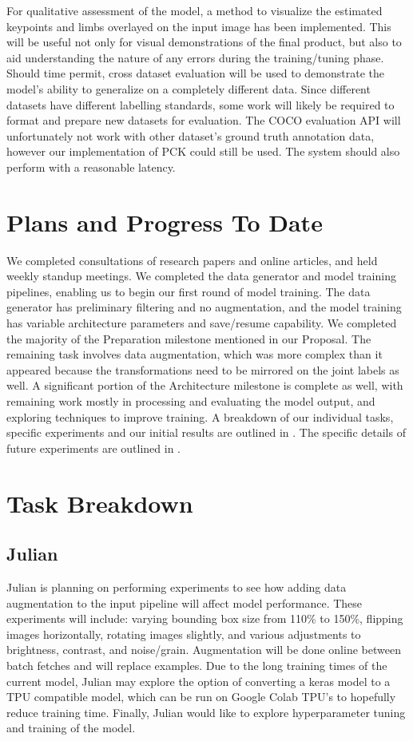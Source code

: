 \documentclass[11pt, letterpaper]{article}
\begin{document}
For qualitative assessment of the model, a method to visualize the estimated keypoints and limbs overlayed on the input image has been implemented. This will be useful not only for visual demonstrations of the final product, but also to aid understanding the nature of any errors during the training/tuning phase. Should time permit, cross dataset evaluation will be used to demonstrate the model’s ability to generalize on a completely different data. Since different datasets have different labelling standards, some work will likely be required to format and prepare new datasets for evaluation. The COCO evaluation API will unfortunately not work with other dataset’s ground truth annotation data, however our implementation of PCK could still be used. The system should also perform with a reasonable latency.


\section{Plans and Progress To Date}

We completed consultations of research papers and online articles, and held weekly standup meetings. We completed the data generator and model training pipelines, enabling us to begin our first round of model training. The data generator has preliminary filtering and no augmentation, and the model training has variable architecture parameters and save/resume capability. We completed the majority of the Preparation milestone mentioned in our Proposal. The remaining task involves data augmentation, which was more complex than it appeared because the transformations need to be mirrored on the joint labels as well. A significant portion of the Architecture milestone is complete as well, with remaining work mostly in processing and evaluating the model output, and exploring techniques to improve training. A breakdown of our individual tasks, specific experiments and our initial results are outlined in . The specific details of future experiments are outlined in . 

\section{Task Breakdown}
\label{SectionTaskB}

\subsection{Julian}
Julian is planning on performing experiments to see how adding data augmentation to the input pipeline will affect model performance. These experiments will include: varying bounding box size from 110\% to 150\%, flipping images horizontally, rotating images slightly, and various adjustments to brightness, contrast, and noise/grain. Augmentation will be done online between batch fetches and will replace examples. Due to the long training times of the current model, Julian may explore the option of converting a keras model to a TPU compatible model, which can be run on Google Colab TPU’s to hopefully reduce training time. Finally, Julian would like to explore hyperparameter tuning and training of the model.
\end{document}
